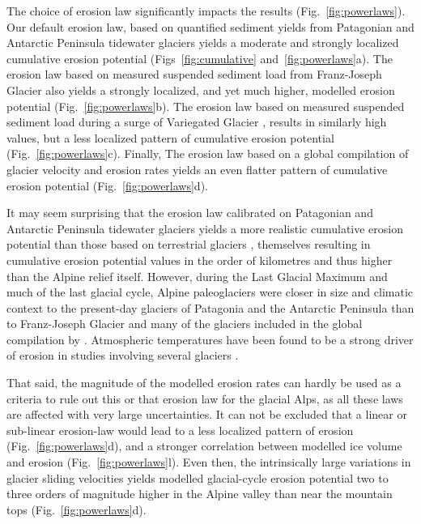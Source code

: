 \documentclass[utf8]{article}
\begin{document}
    The choice of erosion law significantly impacts the results
    (Fig.~\ref{fig:powerlaws}). Our default erosion law, based on quantified
    sediment yields from Patagonian and Antarctic Peninsula tidewater glaciers
    \citep[${\dot{e}=5.2\times10^{-8}u_\mathrm{b}^{2.34}}$,][]{Koppes.etal.2015}
    yields a moderate and strongly localized cumulative erosion potential
    (Figs~\ref{fig:cumulative} and~\ref{fig:powerlaws}a). The erosion law
    based on measured suspended sediment load from Franz-Joseph Glacier
    \citep[${\dot{e}=2.7\times10^{-7}u_\mathrm{b}^{2.02}}$,][]{Herman.etal.2015}
    also yields a strongly localized, and yet much higher, modelled erosion
    potential (Fig.~\ref{fig:powerlaws}b). The erosion law based on measured
    suspended sediment load during a surge of Variegated Glacier
    \citep[${\dot{e}=1\times10^{-4}u_\mathrm{b}^{1}}$,][]{Humphrey.Raymond.1994},
    results in similarly high values, but a less localized pattern of cumulative
    erosion potential (Fig.~\ref{fig:powerlaws}c). Finally, The erosion law
    based on a global compilation of glacier velocity and erosion rates
    \citep[${\dot{e}=1.665\times10^{-1}u_\mathrm{b}^{0.6459}}$,][]{Cook.etal.2020}
    yields an even flatter pattern of cumulative erosion potential
    (Fig.~\ref{fig:powerlaws}d).

    It may seem surprising that the erosion law calibrated on Patagonian and
    Antarctic Peninsula tidewater glaciers \citep{Koppes.etal.2015} yields a
    more realistic cumulative erosion potential than those based on terrestrial
    glaciers \citep{Humphrey.Raymond.1994, Herman.etal.2015, Cook.etal.2020},
    themselves resulting
    in cumulative erosion potential values in the order of kilometres and thus
    higher than the Alpine relief itself. However, during the Last Glacial
    Maximum and much of the last glacial cycle, Alpine paleoglaciers were
    closer in size and climatic context to the present-day glaciers of
    Patagonia and the Antarctic Peninsula \citep{Koppes.etal.2015} than to
    Franz-Joseph Glacier \citep{Herman.etal.2015} and many of the glaciers
    included in the global compilation by \citet{Cook.etal.2020}. Atmospheric
    temperatures have been found to be a strong driver of erosion in studies
    involving several glaciers \citep{Koppes.etal.2015, Cook.etal.2020}.

    That said, the magnitude of the modelled erosion rates can hardly be used
    as a criteria to rule out this or that erosion law for the glacial Alps, as
    all these laws are affected with very large uncertainties. It can not be
    excluded that a linear or sub-linear erosion-law
    \citep[e.g.][]{Cook.etal.2020} would lead to a less localized pattern of
    erosion (Fig.~\ref{fig:powerlaws}d), and a stronger correlation between
    modelled ice volume and erosion (Fig.~\ref{fig:powerlaws}l). Even
    then, the intrinsically large variations in glacier sliding velocities
    yields modelled glacial-cycle erosion potential two to three orders of
    magnitude higher in the Alpine valley than near the mountain tops
    (Fig.~\ref{fig:powerlaws}d).
\end{document}
